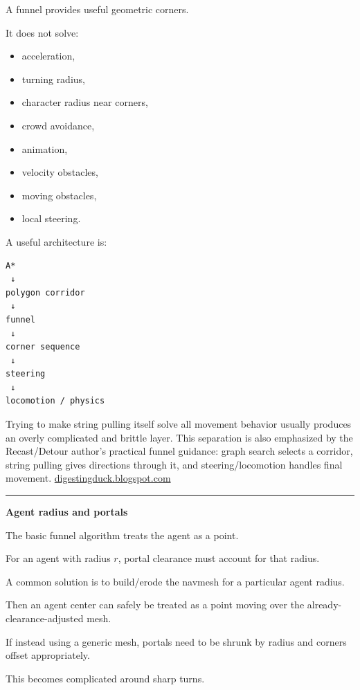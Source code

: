 A funnel provides useful geometric corners.

It does not solve:

\begin{itemize}
\tightlist
\item
  acceleration,
\item
  turning radius,
\item
  character radius near corners,
\item
  crowd avoidance,
\item
  animation,
\item
  velocity obstacles,
\item
  moving obstacles,
\item
  local steering.
\end{itemize}

A useful architecture is:

\begin{verbatim}
A*
 ↓
polygon corridor
 ↓
funnel
 ↓
corner sequence
 ↓
steering
 ↓
locomotion / physics
\end{verbatim}

Trying to make string pulling itself solve all movement behavior usually produces an overly complicated and brittle layer. This separation is also emphasized by the Recast/Detour author's practical funnel guidance: graph search selects a corridor, string pulling gives directions through it, and steering/locomotion handles final movement. \href{https://digestingduck.blogspot.com/2010/03/simple-stupid-funnel-algorithm.html?utm_source=chatgpt.com}{digestingduck.blogspot.com}

\begin{center}\rule{0.5\linewidth}{0.5pt}\end{center}

\textbf{Agent radius and portals}

The basic funnel algorithm treats the agent as a point.

For an agent with radius \(r\), portal clearance must account for that radius.

A common solution is to build/erode the navmesh for a particular agent radius.

Then an agent center can safely be treated as a point moving over the already-clearance-adjusted mesh.

If instead using a generic mesh, portals need to be shrunk by radius and corners offset appropriately.

This becomes complicated around sharp turns.

